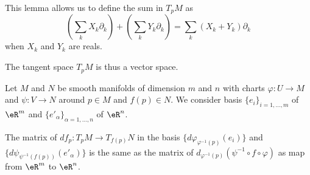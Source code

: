 This lemma allows us to define the sum in \( T_pM\) as      %
\begin{equation}
    \left( \sum_kX_k\partial_k \right)+\left( \sum_kY_k\partial_k \right)=\sum_k (X_k+Y_k)\partial_k
\end{equation}
when \( X_k\) and \( Y_k\) are reals.

The tangent space \( T_pM\) is thus a vector space.

\begin{lemma}       \label{LEMooVCSJooEuDZFz}
    Let \( M\) and \( N\) be smooth manifolds of dimension \( m\) and \( n\) with charts \( \varphi\colon U\to M\) and \( \psi\colon V\to N\) around \( p\in M\) and \( f(p)\in N\). We consider basis \( \{ e_i \}_{i=1,\ldots, m}\) of \( \eR^m\) and \( \{ e'_{\alpha} \}_{\alpha=1,\ldots, n}\) of \( \eR^n\).

    The matrix of \( df_p\colon T_pM\to T_{f(p)}N\) in the basis \( \{ d\varphi_{\varphi^{-1}(p)}(e_i) \}\) and \( \{ d\psi_{\psi^{-1}(f(p))}(e'_{\alpha}) \}\) is the same as the matrix of \( d_{\varphi^{-1}(p)}(\psi^{-1}\circ f\circ\varphi)\) as map from \( \eR^m\) to \( \eR^n\).
\end{lemma}

